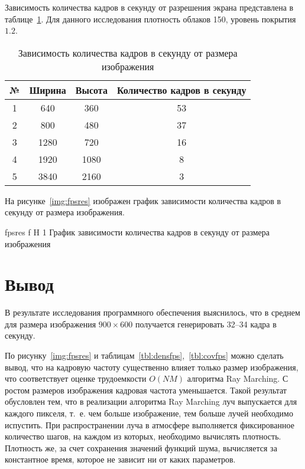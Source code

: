 Зависимость количества кадров в секунду от разрешения экрана представлена в таблице~\ref{tbl:resfps}. Для данного исследования плотность облаков 150, уровень покрытия $1.2$.

\begin{table}[H]
	\begin{center}
		\begin{threeparttable}
			\captionsetup{justification=raggedright,singlelinecheck=off}
			\caption{Зависимость количества кадров в секунду от размера изображения}
			\label{tbl:resfps}
			\begin{tabular}{|c|c|c|c|}
				\hline
				№ & Ширина & Высота & Количество кадров в секунду \\
				\hline
				1 & 640 & 360 & 53 \\
				\hline
				2 & 800 & 480 & 37 \\
				\hline
				3 & 1280 & 720 & 16 \\
				\hline
				4 & 1920 & 1080 & 8 \\
				\hline
				5 & 3840 & 2160 & 3 \\
				\hline
			\end{tabular}
		\end{threeparttable}
	\end{center}
\end{table}

На рисунке~\ref{img:fpsres} изображен график зависимости количества кадров в секунду от размера изображения.

{fpsres} %
{f} %
{H} %
{1\textwidth} %
{График зависимости количества кадров в секунду от размера изображения} %

\section*{Вывод}

В результате исследования программного обеспечения выяснилось, что в среднем для размера изображения $900 \times 600$ получается генерировать 32--34 кадра в секунду.

По рисунку~\ref{img:fpsres} и таблицам~\ref{tbl:densfps},~\ref{tbl:covfps} можно сделать вывод, что на кадровую частоту существенно влияет только размер изображения, что соответствует оценке трудоемкости $O(NM)$ алгоритма Ray Marching. 
С ростом размеров изображения кадровая частота уменьшается. Такой результат обусловлен тем, что в реализации алгоритма Ray Marching луч выпускается для каждого пикселя, т.~е. чем больше изображение, тем больше лучей необходимо испустить. При распространении луча в атмосфере выполняется фиксированное количество шагов, на каждом из которых, необходимо вычислять плотность. Плотность же, за счет сохранения значений функций шума, вычисляется за константное время, которое не зависит ни от каких параметров.